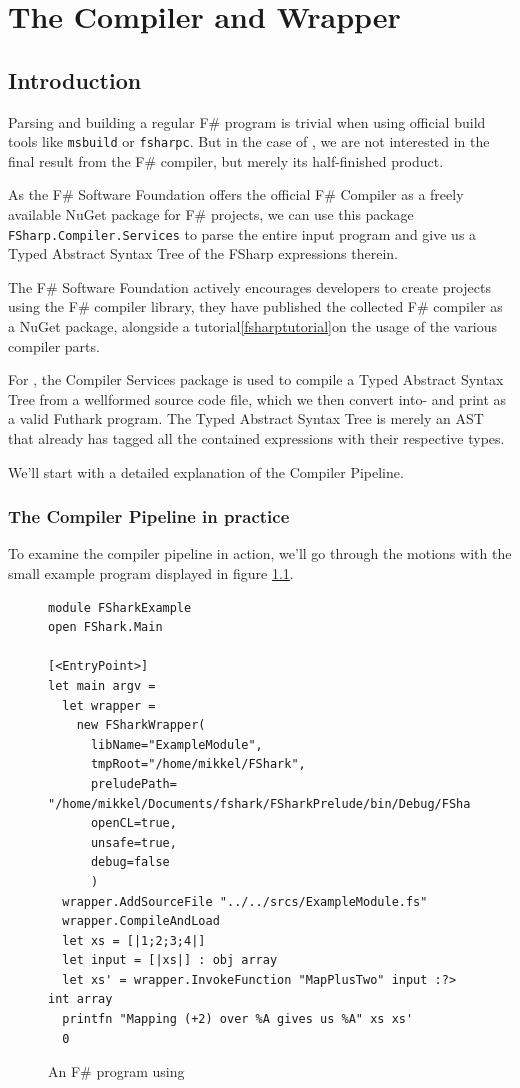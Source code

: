 \chapter{The \fshark{} Compiler and Wrapper}
\section*{Introduction}
\label{sec:fsharkcompiler}
Parsing and building a regular F\# program is trivial when using official build tools like
\texttt{msbuild} or \texttt{fsharpc}.
But in the case of \fshark{}, we are not interested in the final result from the
F\# compiler, but merely its half-finished product.

As the F\# Software Foundation offers the official F\# Compiler as a freely
available NuGet package for F\# projects, we can use this package
\texttt{FSharp.Compiler.Services} to parse the entire input \fshark{} program and
give us a Typed Abstract Syntax Tree of the FSharp expressions therein.

The F\# Software Foundation actively encourages developers to create projects
using the F\# compiler library, they have published the collected F\# compiler
as a NuGet package, alongside a tutorial\ref{fsharptutorial}on the usage of the
various compiler parts.

For \fshark{}, the Compiler Services package is used to compile a Typed Abstract
Syntax Tree from a wellformed \fshark{} source code file, which we then
convert into- and print as a valid Futhark program.
The Typed Abstract Syntax Tree is merely an AST that already has tagged all the
contained expressions with their respective types.

We'll start with a detailed explanation of the \fshark{} Compiler Pipeline.

\subsection*{The \fshark{} Compiler Pipeline in practice}
To examine the compiler pipeline in action, we'll go through the motions with
the small example program displayed in figure \ref{fig:fsharkusageexample}.

\begin{figure}[h]
  \centering
    \begin{verbatim}
module FSharkExample
open FShark.Main

[<EntryPoint>]
let main argv =
  let wrapper = 
    new FSharkWrapper(
      libName="ExampleModule",
      tmpRoot="/home/mikkel/FShark",
      preludePath= "/home/mikkel/Documents/fshark/FSharkPrelude/bin/Debug/FSharkPrelude.dll",
      openCL=true,
      unsafe=true,
      debug=false
      )
  wrapper.AddSourceFile "../../srcs/ExampleModule.fs"
  wrapper.CompileAndLoad
  let xs = [|1;2;3;4|]
  let input = [|xs|] : obj array
  let xs' = wrapper.InvokeFunction "MapPlusTwo" input :?> int array
  printfn "Mapping (+2) over %A gives us %A" xs xs'
  0
    \end{verbatim}
  \caption{An F\# program using \fshark{}}
  \label{fig:fsharkusageexample}
\end{figure}

